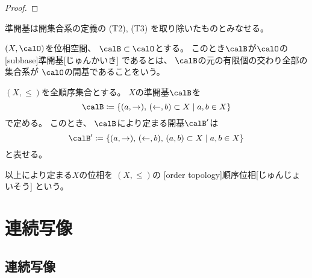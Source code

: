 \documentclass[report]{jlreq}
\begin{document}
\begin{proof}
    \TODO{}
\end{proof}

準開基は開集合系の定義の (T2), (T3) を取り除いたものとみなせる。

\begin{definition}[準開基]
    $(X, \calO)$を位相空間、
    $\calB \subset \calO$とする。
    このとき$\calB$が$\calO$の
    [subbase]{準開基}[じゅんかいき]
    であるとは、
    $\calB$の元の有限個の交わり全部の集合系が
    $\calO$の開基であることをいう。
\end{definition}

\begin{example}[順序位相]
    $(X, \le)$を全順序集合とする。
    $X$の準開基$\calB$を
    \begin{equation}
        \calB
            \coloneqq \mybrace{
                (a, \rightarrow), \,
                (\leftarrow, b)
                \subset X
                \mid
                a, b \in X
            }
    \end{equation}
    で定める。
    このとき、
    $\calB$により定まる開基$\calB'$は
    \begin{equation}
        \calB'
            \coloneqq \mybrace{
                (a, \rightarrow), \,
                (\leftarrow, b), \,
                (a, b) \subset X
                \mid
                a, b \in X
            }
    \end{equation}
    と表せる。
    \begin{innerproof}
        \TODO{}
    \end{innerproof}
    以上により定まる$X$の位相を
    $(X, \le)$の
    [order topology]{順序位相}[じゅんじょいそう]
    という。
\end{example}

\begin{definition}[第2可算]
    \TODO{}
\end{definition}



%
\chapter{連続写像}

%
\section{連続写像}
\end{document}
